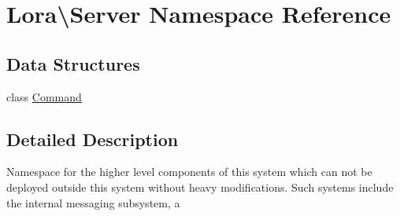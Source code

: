\hypertarget{namespace_lora_1_1_server}{}\section{Lora\textbackslash{}Server Namespace Reference}
\label{namespace_lora_1_1_server}
\subsection*{Data Structures}
\begin{DoxyCompactItemize}
\item 
class \hyperlink{class_lora_1_1_server_1_1_command}{Command}
\end{DoxyCompactItemize}


\subsection{Detailed Description}
Namespace for the higher level components of this system which can not be deployed outside this system without heavy modifications. Such systems include the internal messaging subsystem, a 